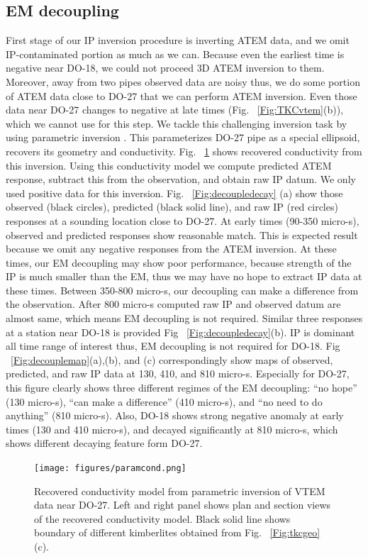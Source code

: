 \documentclass[letterpaper,11pt]{article}
\begin{document}
\subsection{EM decoupling}
First stage of our IP inversion procedure is inverting ATEM data, and we omit IP-contaminated portion as much as we can. Because even the earliest time is negative near DO-18, we could not proceed 3D ATEM inversion to them. Moreover, away from two pipes observed data are noisy thus, we do some portion of ATEM data close to DO-27 that we can perform ATEM inversion. Even those data near DO-27 changes to negative at late times (Fig. ~\ref{Fig:TKCvtem}(b)), which we cannot use for this step. We tackle this challenging inversion task by using parametric inversion \cite[]{McMillan2015}. This parameterizes DO-27 pipe as a special ellipsoid, recovers its geometry and conductivity. Fig. ~\ref{Fig:paramcond} shows recovered conductivity from this inversion. Using this conductivity model we compute predicted ATEM response, subtract this from the observation, and obtain raw IP datum. We only used positive data for this inversion. Fig. ~\ref{Fig:decoupledecay} (a) show those observed (black circles), predicted (black solid line), and raw IP (red circles) responses at a sounding location close to DO-27. At early times (90-350 micro-s), observed and predicted responses show reasonable match. This is expected result because we omit any negative responses from the ATEM inversion. At these times, our EM decoupling may show poor performance, because strength of the IP is much smaller than the EM, thus we may have no hope to extract IP data at these times. Between 350-800 micro-s, our decoupling can make a difference from the observation. After 800 micro-s computed raw IP and observed datum are almost same, which means EM decoupling is not required. Similar three responses at a station near DO-18 is provided Fig ~\ref{Fig:decoupledecay}(b). IP is dominant all time range of interest thus, EM decoupling is not required for DO-18. Fig ~\ref{Fig:decouplemap}(a),(b), and (c) correspondingly show maps of observed, predicted, and raw IP data at 130, 410, and 810 micro-s. Especially for DO-27, this figure clearly shows three different regimes of the EM decoupling: ``no hope'' (130 micro-s), ``can make a difference'' (410 micro-s), and ``no need to do anything'' (810 micro-s). Also, DO-18 shows strong negative anomaly at early times (130 and 410 micro-s), and decayed significantly at 810 micro-s, which shows different decaying feature form DO-27. 

\begin{figure}[htb]
  \centering
  \texttt{[image: figures/paramcond.png]}
  \caption{Recovered conductivity model from parametric inversion of VTEM data near DO-27. Left and right panel shows plan and section views of the recovered conductivity model. Black solid line shows boundary of different kimberlites obtained from Fig. ~\ref{Fig:tkcgeo}(c). }
  \label{Fig:paramcond}
\end{figure}
\end{document}
